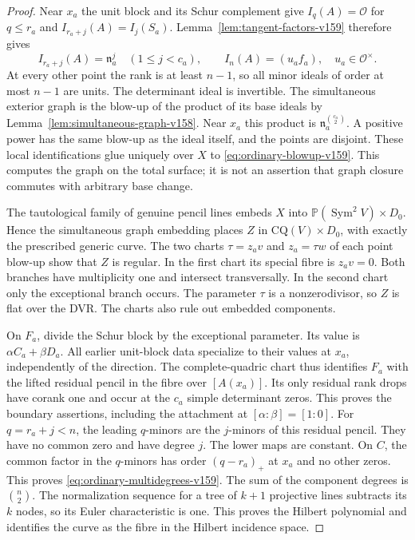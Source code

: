 \documentclass[11pt,reqno]{amsart}
\numberwithin{equation}{section}
\theoremstyle{definition}\newtheorem{definition}[theorem]{Definition}
\theoremstyle{remark}\newtheorem{remark}[theorem]{Remark}
\newcommand{\Pj}{\mathbb P}\newcommand{\A}{\mathbb A}
\newcommand{\OO}{\mathcal O}\newcommand{\II}{\mathcal I}
\DeclareMathOperator{\Sym}{Sym}\DeclareMathOperator{\Gr}{Gr}
\begin{document}
\begin{proof}
Near $x_a$ the unit block and its Schur complement give
$I_q(A)=\OO$ for $q\leq r_a$ and
$I_{r_a+j}(A)=I_j(S_a)$. Lemma~\ref{lem:tangent-factors-v159}
therefore gives
\[
 I_{r_a+j}(A)=\mathfrak n_a^j\quad(1\leq j<c_a),\qquad
 I_n(A)=(u_a f_a),\quad u_a\in\OO^\times.
\]
At every other point the rank is at least $n-1$, so all minor ideals
of order at most $n-1$ are units. The determinant ideal is invertible.
The simultaneous exterior graph is the blow-up of the product of
its base ideals by Lemma~\ref{lem:simultaneous-graph-v158}.
Near $x_a$ this product is
$\mathfrak n_a^{\binom{c_a}{2}}$. A positive power has the same
blow-up as the ideal itself, and the points are disjoint. These local
identifications glue uniquely over $X$ to \eqref{eq:ordinary-blowup-v159}.
This computes the graph on the total surface; it is not an assertion
that graph closure commutes with arbitrary base change.

The tautological family of genuine pencil lines embeds $X$ into
$\Pj(\Sym^2V)\times D_0$. Hence the simultaneous graph embedding
places $Z$ in $\mathrm{CQ}(V)\times D_0$, with exactly the prescribed
generic curve. The two charts $\tau=z_av$ and $z_a=\tau w$ of each
point blow-up show that $Z$ is regular. In the first chart its special
fibre is $z_av=0$. Both branches have multiplicity one and intersect
transversally. In the second chart only the exceptional branch occurs.
The parameter $\tau$ is a nonzerodivisor, so $Z$ is flat over the DVR.
The charts also rule out embedded components.

On $F_a$, divide the Schur block by the exceptional parameter.
Its value is $\alpha C_a+\beta D_a$. All earlier unit-block data
specialize to their values at $x_a$, independently of the direction.
The complete-quadric chart thus identifies $F_a$ with the lifted
residual pencil in the fibre over $[A(x_a)]$. Its only residual rank
drops have corank one and occur at the $c_a$ simple determinant zeros.
This proves the boundary assertions, including the attachment at
$[\alpha:\beta]=[1:0]$. For $q=r_a+j<n$, the leading $q$-minors
are the $j$-minors of this residual pencil. They have no common zero
and have degree $j$. The lower maps are constant. On $C$, the common
factor in the $q$-minors has order $(q-r_a)_+$ at $x_a$ and no other
zeros. This proves \eqref{eq:ordinary-multidegrees-v159}.
The sum of the component degrees is $\binom n2$. The normalization
sequence for a tree of $k+1$ projective lines subtracts its $k$ nodes,
so its Euler characteristic is one. This proves the Hilbert polynomial
and identifies the curve as the fibre in the Hilbert incidence space.


\end{proof}
\end{document}
